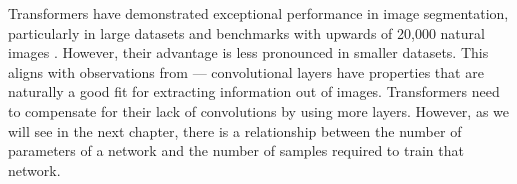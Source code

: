  Transformers have demonstrated exceptional performance in image segmentation, particularly in large datasets and benchmarks with upwards of 20,000 natural images \cite{liu2021Swin, SETR, chen2022vitadapter}. However, their advantage is less pronounced in smaller datasets. This aligns with observations from \cite{attnAllYouNeed} --- convolutional layers have properties that are naturally a good fit for extracting information out of images. Transformers need to compensate for their lack of convolutions by using more layers. However, as we will see in the next chapter, there is a relationship between the number of parameters of a network and the number of samples required to train that network.

